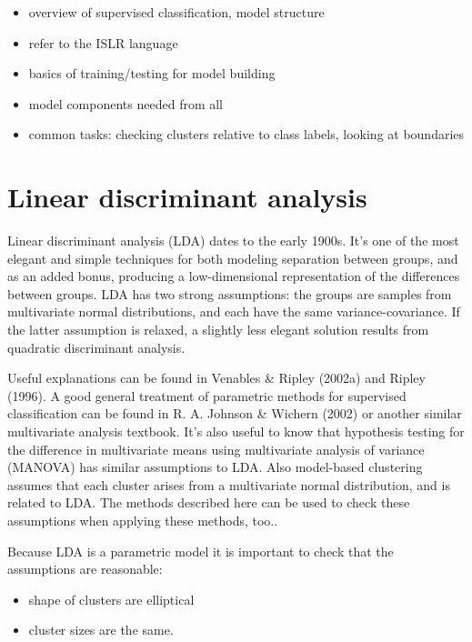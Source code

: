 \documentclass[
  letterpaper,
]{book}
\providecommand{\tightlist}{%
  \setlength{\itemsep}{0pt}\setlength{\parskip}{0pt}}\usepackage{longtable,booktabs,array}
\begin{document}
\begin{itemize}
\tightlist
\item
  overview of supervised classification, model structure
\item
  refer to the ISLR language
\item
  basics of training/testing for model building
\item
  model components needed from all
\item
  common tasks: checking clusters relative to class labels, looking at
  boundaries
\end{itemize}

\hypertarget{linear-discriminant-analysis}{%
\chapter{Linear discriminant
analysis}\label{linear-discriminant-analysis}}

Linear discriminant analysis (LDA) dates to the early 1900s. It's one of
the most elegant and simple techniques for both modeling separation
between groups, and as an added bonus, producing a low-dimensional
representation of the differences between groups. LDA has two strong
assumptions: the groups are samples from multivariate normal
distributions, and each have the same variance-covariance. If the latter
assumption is relaxed, a slightly less elegant solution results from
quadratic discriminant analysis.

Useful explanations can be found in Venables \& Ripley (2002a) and
Ripley (1996). A good general treatment of parametric methods for
supervised classification can be found in R. A. Johnson \& Wichern
(2002) or another similar multivariate analysis textbook. It's also
useful to know that hypothesis testing for the difference in
multivariate means using multivariate analysis of variance (MANOVA) has
similar assumptions to LDA. Also model-based clustering assumes that
each cluster arises from a multivariate normal distribution, and is
related to LDA. The methods described here can be used to check these
assumptions when applying these methods,
too..

Because LDA is a parametric model it is important to check that the
assumptions are reasonable:

\begin{itemize}
\tightlist
\item
  shape of clusters are elliptical
\item
  cluster sizes are the same.
\end{itemize}
\end{document}
